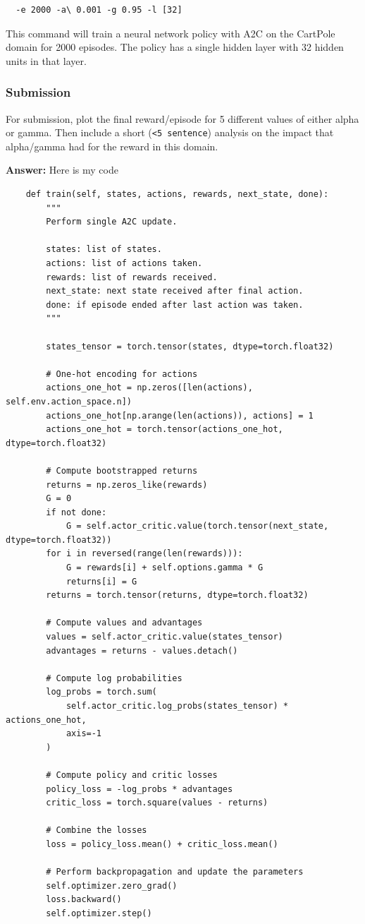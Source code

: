\documentclass[a4paper]{article}
\theoremstyle{definition}
\begin{document}
\begin{enumerate}
\begin{verbatim}
  -e 2000 -a\ 0.001 -g 0.95 -l [32]
\end{verbatim}
% 
This command will train a neural network policy with A2C on the CartPole domain for 2000 episodes.
% 
The policy has a single hidden layer with 32 hidden units in that layer.
\subsubsection*{Submission}
% 

For submission, plot the final reward/episode for 5 different values of either alpha or gamma. Then include a short (\verb|<5 sentence|) analysis on the impact that alpha/gamma had for the reward in this domain.



\end{enumerate}

\textbf{Answer:}
Here is my code


\begin{lstlisting}
    def train(self, states, actions, rewards, next_state, done):
        """
        Perform single A2C update.

        states: list of states.
        actions: list of actions taken.
        rewards: list of rewards received.
        next_state: next state received after final action.
        done: if episode ended after last action was taken.
        """

        states_tensor = torch.tensor(states, dtype=torch.float32)

        # One-hot encoding for actions
        actions_one_hot = np.zeros([len(actions), self.env.action_space.n])
        actions_one_hot[np.arange(len(actions)), actions] = 1
        actions_one_hot = torch.tensor(actions_one_hot, dtype=torch.float32)

        # Compute bootstrapped returns
        returns = np.zeros_like(rewards)
        G = 0
        if not done:
            G = self.actor_critic.value(torch.tensor(next_state, dtype=torch.float32))
        for i in reversed(range(len(rewards))):
            G = rewards[i] + self.options.gamma * G
            returns[i] = G
        returns = torch.tensor(returns, dtype=torch.float32)

        # Compute values and advantages
        values = self.actor_critic.value(states_tensor)
        advantages = returns - values.detach()

        # Compute log probabilities
        log_probs = torch.sum(
            self.actor_critic.log_probs(states_tensor) * actions_one_hot,
            axis=-1
        )

        # Compute policy and critic losses
        policy_loss = -log_probs * advantages
        critic_loss = torch.square(values - returns)

        # Combine the losses
        loss = policy_loss.mean() + critic_loss.mean()

        # Perform backpropagation and update the parameters
        self.optimizer.zero_grad()
        loss.backward()
        self.optimizer.step()
\end{lstlisting}
\end{document}
